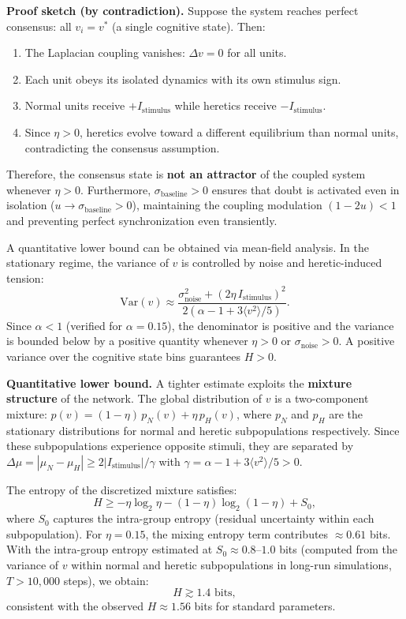 \documentclass[11pt]{article}
\begin{document}
\textbf{Proof sketch (by contradiction).} Suppose the system reaches perfect consensus: all $v_i = v^*$ (a single cognitive state). Then:
\begin{enumerate}
    \item The Laplacian coupling vanishes: $\Delta v = 0$ for all units.
    \item Each unit obeys its isolated dynamics with its own stimulus sign.
    \item Normal units receive $+I_{\text{stimulus}}$ while heretics receive $-I_{\text{stimulus}}$.
    \item Since $\eta > 0$, heretics evolve toward a different equilibrium than normal units, contradicting the consensus assumption.
\end{enumerate}
Therefore, the consensus state is \textbf{not an attractor} of the coupled system whenever $\eta > 0$. Furthermore, $\sigma_{\text{baseline}} > 0$ ensures that doubt is activated even in isolation ($u \to \sigma_{\text{baseline}} > 0$), maintaining the coupling modulation $(1-2u) < 1$ and preventing perfect synchronization even transiently.

A quantitative lower bound can be obtained via mean-field analysis. In the stationary regime, the variance of $v$ is controlled by noise and heretic-induced tension:
\begin{equation}
    \text{Var}(v) \approx \frac{\sigma_{\text{noise}}^2 + (2\eta\, I_{\text{stimulus}})^2}{2(\alpha - 1 + 3\langle v^2 \rangle / 5)}.
    \label{eq:variance_bound}
\end{equation}
Since $\alpha < 1$ (verified for $\alpha = 0.15$), the denominator is positive and the variance is bounded below by a positive quantity whenever $\eta > 0$ or $\sigma_{\text{noise}} > 0$. A positive variance over the cognitive state bins guarantees $H > 0$.

\textbf{Quantitative lower bound.} A tighter estimate exploits the \textbf{mixture structure} of the network. The global distribution of $v$ is a two-component mixture: $p(v) = (1-\eta)\, p_N(v) + \eta\, p_H(v)$, where $p_N$ and $p_H$ are the stationary distributions for normal and heretic subpopulations respectively. Since these subpopulations experience opposite stimuli, they are separated by $\Delta\mu = |\mu_N - \mu_H| \geq 2|I_{\text{stimulus}}|/\gamma$ with $\gamma = \alpha - 1 + 3\langle v^2\rangle/5 > 0$.

The entropy of the discretized mixture satisfies:
\begin{equation}
    H \geq -\eta\log_2\eta - (1-\eta)\log_2(1-\eta) + S_0,
    \label{eq:entropy_bound}
\end{equation}
where $S_0$ captures the intra-group entropy (residual uncertainty within each subpopulation). For $\eta = 0.15$, the mixing entropy term contributes $\approx 0.61$ bits. With the intra-group entropy estimated at $S_0 \approx 0.8$--$1.0$ bits (computed from the variance of $v$ within normal and heretic subpopulations in long-run simulations, $T > 10{,}000$ steps), we obtain:
\[
H \gtrsim 1.4 \text{ bits},
\]
consistent with the observed $H \approx 1.56$ bits for standard parameters.
\end{document}
